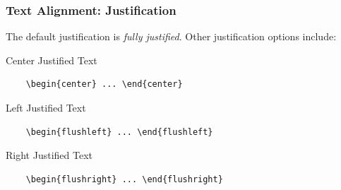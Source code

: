 \begin{frame}[fragile]
\frametitle{Text Alignment: Justification}
The default justification is \emph{fully justified}. Other justification options include: \pause
\begin{block}{Center Justified Text}
    \begin{verbatim}
    \begin{center} ... \end{center}    
    \end{verbatim}
\end{block} \pause
\begin{block}{Left Justified Text}
    \begin{verbatim}
    \begin{flushleft} ... \end{flushleft}    
    \end{verbatim}
\end{block} \pause
\begin{block}{Right Justified Text}
    \begin{verbatim}
    \begin{flushright} ... \end{flushright}    
    \end{verbatim}
\end{block}
\end{frame}



